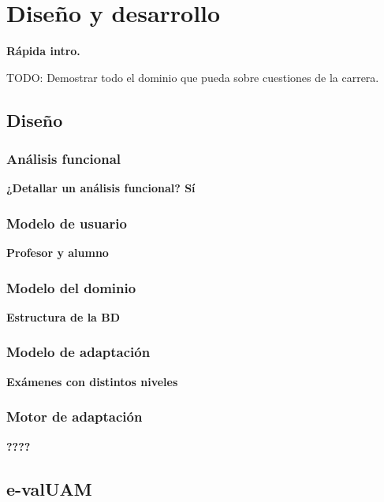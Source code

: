 \chapter{Diseño y desarrollo\label{sec:disenhoYDesarrollo}}

\textbf{Rápida intro.}

TODO: Demostrar todo el dominio que pueda sobre cuestiones de la carrera.

\section{Diseño}

\subsection{Análisis funcional}

\textbf{¿Detallar un análisis funcional? Sí}

\subsection{Modelo de usuario}

\textbf{Profesor y alumno}

\subsection{Modelo del dominio}

\textbf{Estructura de la BD}

\subsection{Modelo de adaptación}

\textbf{Exámenes con distintos niveles}

\subsection{Motor de adaptación}

\textbf{????}

\section{e-valUAM}
